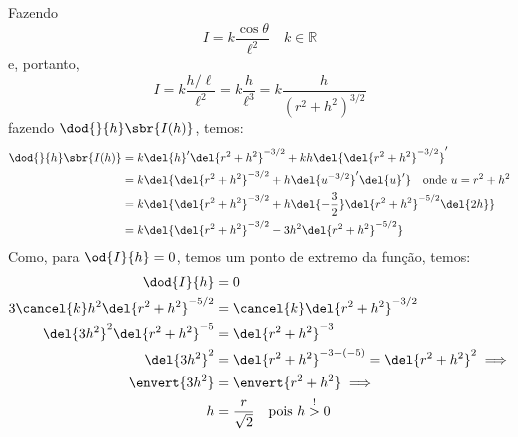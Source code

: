 \documentclass[]{IMTexam}
\begin{document}
\begin{questions}
\begin{solution}
\begin{multi}
		\end{multi}

		Fazendo \[ I=k\dfrac{\cos\theta}{\ell^{2}}\quad k\in\mathbb{R} \] e, portanto,
		\begin{equation}\label{eq:q1I}
			I=k\dfrac{h/\ell}{\ell^{2}}=k\dfrac{h}{\ell^{3}}=k\dfrac{h}{(r^{2}+h^{2})^{3/2}}
		\end{equation}
		fazendo $ \dod{}{h}\sbr{I(h)} $, temos:
		\begin{align}
			\dod{}{h}\sbr{I(h)} & = k\del{h}'\del{r^{2}+h^{2}}^{-3/2}+kh\del{\del{r^{2}+h^{2}}^{-3/2}}'                     \nonumber \\
			                    & =k\del{\del{r^{2}+h^{2}}^{-3/2}+h\del{u^{-3/2}}'\del{u}'}\quad \text{onde } u=r^{2}+h^{2}\nonumber  \\
			                    & =k\del{\del{r^{2}+h^{2}}^{-3/2}+h\del{-\dfrac{3}{2}}\del{r^{2}+h^{2}}^{-5/2}\del{2h}} \nonumber     \\
			                    & =k\del{\del{r^{2}+h^{2}}^{-3/2}-3h^{2}\del{r^{2}+h^{2}}^{-5/2}}\label{eq:q1Idot}
		\end{align}
		Como, para $ \od{I}{h}=0 $, temos um ponto de extremo da função, temos:
		\begin{align*}
			\dod{I}{h}                               & =0                                                         \\
			3\cancel{k}h^{2}\del{r^{2}+h^{2}}^{-5/2} & =\cancel{k}\del{r^{2}+h^{2}}^{-3/2}                        \\
			\del{3h^{2}}^{2}\del{r^{2}+h^{2}}^{-5}   & =\del{r^{2}+h^{2}}^{-3}                                    \\
			\del{3h^{2}}^{2}                         & =\del{r^{2}+h^{2}}^{-3-(-5)}=\del{r^{2}+h^{2}}^{2}\implies \\
			\envert{3h^{2}}                          & =\envert{r^{2}+h^{2}}\implies                              \\
			h                                        & =\dfrac{r}{\sqrt{2}}\quad\text{pois }h\overset{!}{>}0

\end{align*}
\end{solution}
\end{questions}
\end{document}
